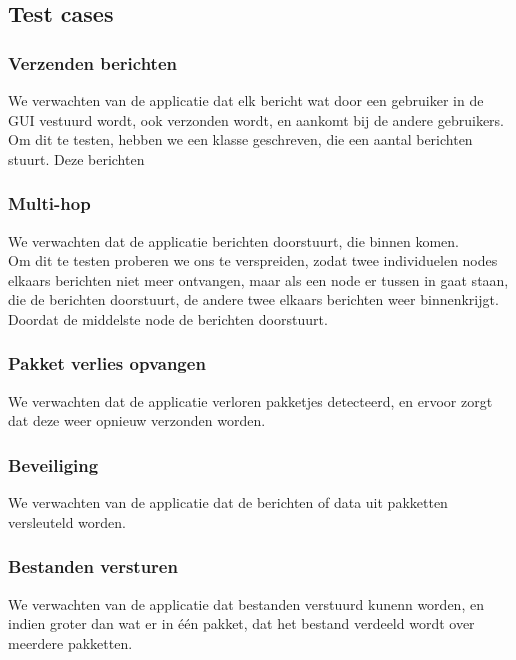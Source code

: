 \documentclass{article}
\begin{document}
\subsection{Test cases}
\subsubsection{Verzenden berichten}
We verwachten van de applicatie dat elk bericht wat door een gebruiker in de GUI vestuurd wordt, ook verzonden wordt, en aankomt bij de andere gebruikers. \\
Om dit te testen, hebben we een klasse geschreven, die een aantal berichten stuurt. Deze berichten 
\subsubsection{Multi-hop}
We verwachten dat de applicatie berichten doorstuurt, die binnen komen. \\
Om dit te testen proberen we ons te verspreiden, zodat twee individuelen nodes elkaars berichten niet meer ontvangen, maar als een node er tussen in gaat staan, die de berichten doorstuurt, de andere twee elkaars berichten weer binnenkrijgt. Doordat de middelste node de berichten doorstuurt. \\
\subsubsection{Pakket verlies opvangen}
We verwachten dat de applicatie verloren pakketjes detecteerd, en ervoor zorgt dat deze weer opnieuw verzonden worden. \\

\subsubsection{Beveiliging}
We verwachten van de applicatie dat de berichten of data uit pakketten versleuteld worden. \\

\subsubsection{Bestanden versturen}
We verwachten van de applicatie dat bestanden verstuurd kunenn worden, en indien groter dan wat er in \'{e}\'{e}n pakket, dat het bestand verdeeld wordt over meerdere pakketten. \\
\end{document}
